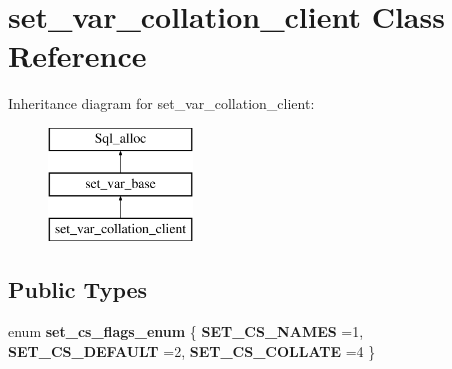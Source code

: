 \hypertarget{classset__var__collation__client}{}\section{set\+\_\+var\+\_\+collation\+\_\+client Class Reference}
\label{classset__var__collation__client}
Inheritance diagram for set\+\_\+var\+\_\+collation\+\_\+client\+:\begin{figure}[H]
\begin{center}
\leavevmode
\includegraphics[height=3.000000cm]{classset__var__collation__client}
\end{center}
\end{figure}
\subsection*{Public Types}
\begin{DoxyCompactItemize}
\item 
\mbox{\label{classset__var__collation__client_a012a809087ed2af62ef825093f1c5a96}} 
enum {\bfseries set\+\_\+cs\+\_\+flags\+\_\+enum} \{ {\bfseries S\+E\+T\+\_\+\+C\+S\+\_\+\+N\+A\+M\+ES} =1, 
{\bfseries S\+E\+T\+\_\+\+C\+S\+\_\+\+D\+E\+F\+A\+U\+LT} =2, 
{\bfseries S\+E\+T\+\_\+\+C\+S\+\_\+\+C\+O\+L\+L\+A\+TE} =4
 \}
\end{DoxyCompactItemize}
